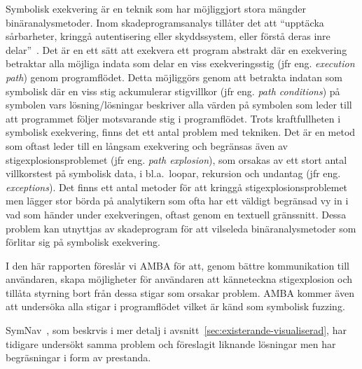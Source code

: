 Symbolisk exekvering är en teknik som har möjliggjort stora mängder binäranalysmetoder\cite{survey_symb_exc, symnav}.
Inom skadeprogramsanalys tillåter det att ``upptäcka sårbarheter, kringgå autentisering eller skyddssystem, eller förstå deras inre delar''~\cite{symnav}.
Det är en ett sätt att exekvera ett program abstrakt där en exekvering betraktar alla möjliga indata som delar en viss exekveringsstig (jfr eng. \emph{execution path}) genom programflödet.
Detta möjliggörs genom att betrakta indatan som symbolisk där en viss stig ackumulerar stigvillkor (jfr eng. \emph{path conditions}) på symbolen vars lösning/lösningar beskriver alla värden på symbolen som leder till att programmet följer motsvarande stig i programflödet.
Trots kraftfullheten i symbolisk exekvering, finns det ett antal problem med tekniken.
Det är en metod som oftast leder till en långsam exekvering och begränsas även av stigexplosionsproblemet (jfr eng. \emph{path explosion}), som orsakas av ett stort antal villkorstest på symbolisk data, i bl.a.\ loopar, rekursion och undantag (jfr eng. \emph{exceptions}).
Det finns ett antal metoder för att kringgå stigexplosionsproblemet men lägger stor börda på analytikern som ofta har ett väldigt begränsad vy in i vad som händer under exekveringen, oftast genom en textuell gränssnitt.
Dessa problem kan utnyttjas av skadeprogram för att vilseleda binäranalysmetoder som förlitar sig på symbolisk exekvering.

I den här rapporten föreslår vi AMBA för att, genom bättre kommunikation till
användaren, skapa möjligheter för användaren att känneteckna stigexplosion och
tillåta styrning bort från dessa stigar som orsakar problem. AMBA kommer även
att undersöka alla stigar i programflödet vilket är känd som symbolisk fuzzing.

SymNav~\cite{symnav}, som beskrvis i mer detalj i
avsnitt~\ref{sec:existerande-visualiserad}, har tidigare undersökt samma problem och
föreslagit liknande lösningar men har begräsningar i form av prestanda.



%

